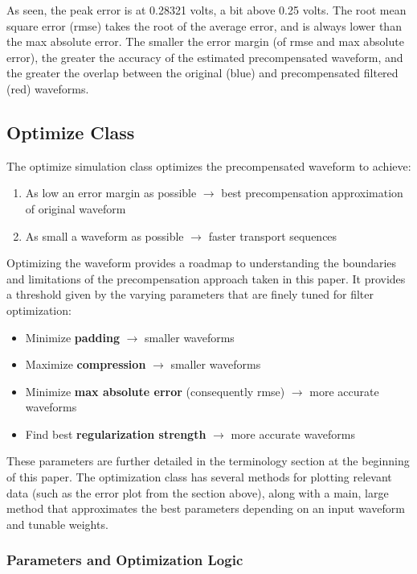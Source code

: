 \documentclass[11pt, a4paper]{article}
\theoremstyle{definition}
\numberwithin{equation}{section}
\begin{document}
As seen, the peak error is at 0.28321 volts, a bit above 0.25 volts. The root mean square error (rmse) takes the root of the average error, and is always lower than the max absolute error. The smaller the error margin (of rmse and max absolute error), the greater the accuracy of the estimated precompensated waveform, and the greater the overlap between the original (blue) and precompensated filtered (red) waveforms.

\subsection{Optimize Class}

The optimize simulation class optimizes the precompensated waveform to achieve:

\begin{enumerate}
    \item As low an error margin as possible $\rightarrow$ best precompensation approximation of original waveform
    \item As small a waveform as possible $\rightarrow$ faster transport sequences
\end{enumerate}

Optimizing the waveform provides a roadmap to understanding the boundaries and limitations of the precompensation approach taken in this paper. It provides a threshold given by the varying parameters that are finely tuned for filter optimization:

\begin{itemize}
    \item Minimize \textbf{padding} $\rightarrow$ smaller waveforms
    \item Maximize \textbf{compression} $\rightarrow$ smaller waveforms
    \item Minimize \textbf{max absolute error} (consequently rmse) $\rightarrow$ more accurate waveforms
    \item Find best \textbf{regularization strength} $\rightarrow$ more accurate waveforms
\end{itemize}

These parameters are further detailed in the terminology section at the beginning of this paper. The optimization class has several methods for plotting relevant data (such as the error plot from the section above), along with a main, large method that approximates the best parameters depending on an input waveform and tunable weights.

\subsubsection{Parameters and Optimization Logic}
\end{document}
